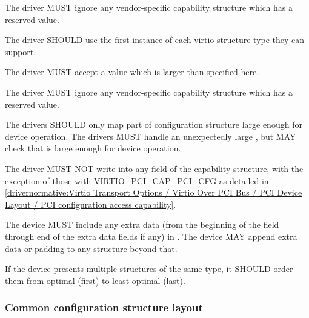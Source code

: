 
The driver MUST ignore any vendor-specific capability structure which has
a reserved  value.

The driver SHOULD use the first instance of each virtio structure type they can
support.

The driver MUST accept a  value which is larger than specified here.

The driver MUST ignore any vendor-specific capability structure which has
a reserved  value.

        The drivers SHOULD only map part of configuration structure
        large enough for device operation.  The drivers MUST handle
        an unexpectedly large , but MAY check that 
        is large enough for device operation.

The driver MUST NOT write into any field of the capability structure,
with the exception of those with  VIRTIO_PCI_CAP_PCI_CFG as
detailed in \ref{drivernormative:Virtio Transport Options / Virtio Over PCI Bus / PCI Device Layout / PCI configuration access capability}.


The device MUST include any extra data (from the beginning of the  field
through end of the extra data fields if any) in .
The device MAY append extra data
or padding to any structure beyond that.

If the device presents multiple structures of the same type, it SHOULD order
them from optimal (first) to least-optimal (last).

\subsubsection{Common configuration structure layout}\label{sec:Virtio Transport Options / Virtio Over PCI Bus / PCI Device Layout / Common configuration structure layout}

